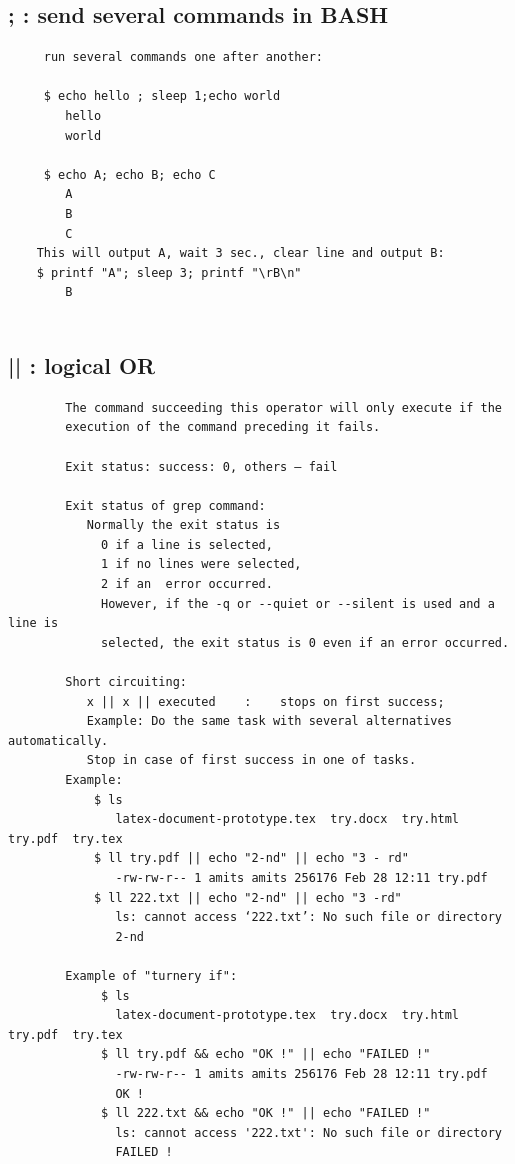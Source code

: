 \documentclass[a4paper,12pt]{article}
\begin{document}
\subsection{;  : send several commands in BASH }
\begin{verbatim}
     run several commands one after another:
     
     $ echo hello ; sleep 1;echo world
        hello
        world
        
     $ echo A; echo B; echo C
        A
        B
        C   
    This will output A, wait 3 sec., clear line and output B:
    $ printf "A"; sleep 3; printf "\rB\n"
        B 
     
\end{verbatim}

\subsection{||  : logical OR }
\begin{verbatim}
        The command succeeding this operator will only execute if the   
        execution of the command preceding it fails.
    
        Exit status: success: 0, others – fail 
         
        Exit status of grep command:
           Normally the exit status is 
             0 if a line is selected, 
             1 if no lines were selected, 
             2 if an  error occurred.  
	         However, if the -q or --quiet or --silent is used and a line is 
	         selected, the exit status is 0 even if an error occurred. 
	         
	    Short circuiting:   
           x || x || executed    :    stops on first success;
           Example: Do the same task with several alternatives automatically.
           Stop in case of first success in one of tasks.
        Example: 
            $ ls
               latex-document-prototype.tex  try.docx  try.html  try.pdf  try.tex
            $ ll try.pdf || echo "2-nd" || echo "3 - rd"
               -rw-rw-r-- 1 amits amits 256176 Feb 28 12:11 try.pdf
            $ ll 222.txt || echo "2-nd" || echo "3 -rd"
               ls: cannot access ‘222.txt’: No such file or directory
               2-nd

        Example of "turnery if":      
             $ ls 
               latex-document-prototype.tex  try.docx  try.html  try.pdf  try.tex    
	         $ ll try.pdf && echo "OK !" || echo "FAILED !" 
               -rw-rw-r-- 1 amits amits 256176 Feb 28 12:11 try.pdf
               OK !
             $ ll 222.txt && echo "OK !" || echo "FAILED !" 
               ls: cannot access '222.txt': No such file or directory
               FAILED !

\end{verbatim}
\end{document}
